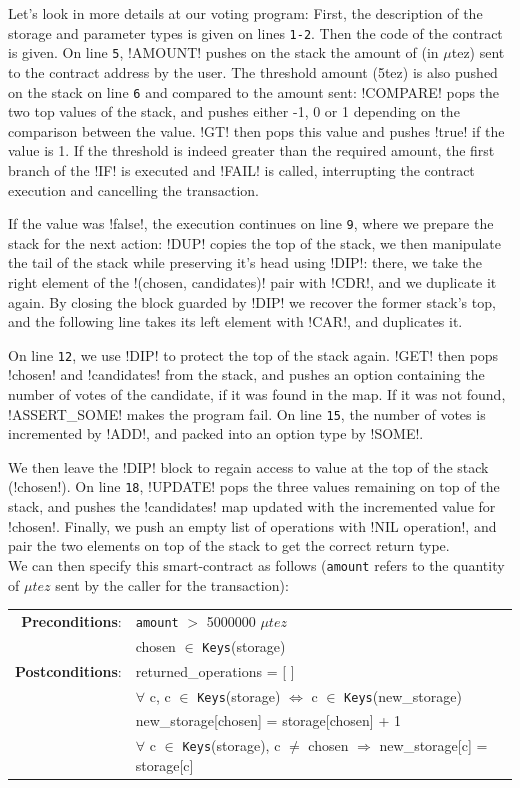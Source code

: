 \documentclass{report}
\begin{document}
Let's look in more details at our voting program: First, the description of the
storage and parameter types is given on lines \texttt{1-2}.  Then the
code of the contract is given.
On line \texttt{5}, !AMOUNT! pushes on the stack the amount
of (in $\mu$tez) sent to the contract address by the user. The threshold amount
(5tez) is also pushed on the stack on line \texttt{6} and compared to
the amount sent:
!COMPARE! pops the two top values of the stack, and pushes
either -1, 0 or 1 depending on the comparison between the
value. !GT! then pops this value and pushes !true!
if the value is 1. If the threshold is indeed greater than the
required amount, the first branch of the !IF! is executed
and !FAIL! is called, interrupting the contract execution
and cancelling the transaction.

If the value was !false!, the execution continues on line
\texttt{9}, where we prepare the stack for the next action:
!DUP! copies the top of the stack, we then manipulate the
tail of the stack while preserving it's head using !DIP!:
there, we take the right element of the !(chosen, candidates)! pair
with !CDR!, and we duplicate it again.  By closing the block
guarded by !DIP! we recover the former stack's top, and the following
line takes its left element with !CAR!, and duplicates it.

On line \texttt{12}, we use !DIP! to protect the top of the
stack again. !GET! then pops !chosen! and
!candidates! from  the stack, and pushes an
option containing the number of votes of the candidate, if it was
found in the map. If it was not found, !ASSERT_SOME! makes
the program fail. On line \texttt{15}, the number of votes is
incremented by !ADD!, and packed into an option type by
!SOME!.

We then leave the !DIP! block to regain access to
value at the top of the stack (!chosen!). On line
\texttt{18}, !UPDATE! pops the three values remaining
on top of the stack, and pushes the !candidates! map updated
with the incremented value for !chosen!. Finally, we push an
empty list of operations with !NIL operation!, and pair the
two elements on top of the stack to get the correct return type.\\

We can then specify this smart-contract as follows (\texttt{amount} refers to the quantity of $\mu tez$ sent by the caller for the transaction):
{\small
\begin{longtable}{rl}
  \textbf{Preconditions}: & \texttt{amount} $>$ 5000000 $\mu tez$\\
  & chosen $\in$ \texttt{Keys}(storage)\\
  \textbf{Postconditions}: & returned\_operations = [ ]\\
  & $\forall$ c, c $\in$ \texttt{Keys}(storage) $\iff$ c $\in$ \texttt{Keys}(new\_storage)\\
  & new\_storage[chosen] = storage[chosen] + 1\\
  & $\forall$ c $\in$ \texttt{Keys}(storage), c $\neq$ chosen $\Rightarrow$ new\_storage[c] = storage[c]
\end{longtable}}
\end{document}
